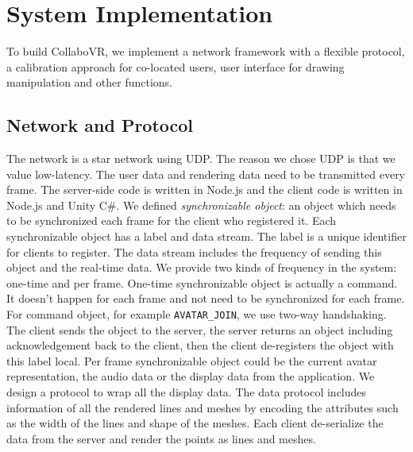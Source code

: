 \documentclass{sigchi}
\begin{document}
\section{System Implementation}
To build CollaboVR, we implement a network framework with a flexible protocol, a calibration approach for co-located users, user interface for drawing manipulation and other functions.

\subsection{Network and Protocol}
The network is a star network using UDP. The reason we chose UDP is that we value low-latency. The user data and rendering data need to be transmitted every frame. The server-side code is written in Node.js and the client code is written in Node.js and Unity C\#. We defined \textit{synchronizable object}: an object which needs to be synchronized each frame for the client who registered it. Each synchronizable object has a label and data stream. The label is a unique identifier for clients to register. The data stream includes the frequency of sending this object and the real-time data. We provide two kinds of frequency in the system: one-time and per frame. One-time synchronizable object is actually a command. It doesn't happen for each frame and not need to be synchronized for each frame. For command object, for example \verb|AVATAR_JOIN|, we use two-way handshaking. The client sends the object to the server, the server returns an object including acknowledgement back to the client, then the client de-registers the object with this label local. Per frame synchronizable object could be the current avatar representation, the audio data or the display data from the application. We design a protocol to wrap all the display data. The data protocol includes information of all the rendered lines and meshes by encoding the attributes such as the width of the lines and shape of the meshes. Each client de-serialize the data from the server and render the points as lines and meshes.
\end{document}
